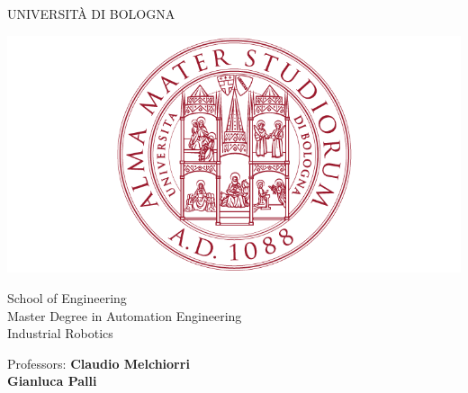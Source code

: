 \documentclass[a4paper,11pt,oneside]{book}
\begin{document}
		\pagestyle{myheadings}
		
		\thispagestyle{empty}                                                 
		\begin{center}                                                            
		    \vspace{5mm}
		    {\LARGE UNIVERSIT\`A DI BOLOGNA} \\                       
		      \vspace{5mm}
		\end{center}
		\begin{center}
		  \includegraphics[scale=.27]{figs/logo_unibo}
		\end{center}
		\begin{center}
		      \vspace{5mm}
		      {\LARGE School of Engineering} \\
		        \vspace{3mm}
		      {\Large Master Degree in Automation Engineering} \\
		      \vspace{20mm}
		      {\LARGE Industrial Robotics} \\
		      \vspace{15mm}
		\end{center}
		\begin{flushleft}                                                                              
		     {\large Professors: \textbf{\@ Claudio Melchiorri}\\  \hspace{20mm} \textbf{\@ Gianluca Palli}} \\  
		     
		      \vspace{13mm}
		\end{flushleft}
\end{document}
